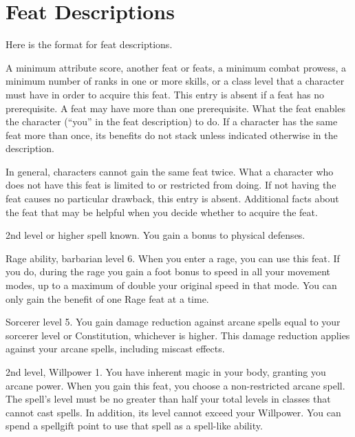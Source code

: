 \twocolumn

\section{Feat Descriptions}
Here is the format for feat descriptions.

\featpre A minimum attribute score, another feat or feats, a minimum combat prowess, a minimum number of ranks in one or more skills, or a class level that a character must have in order to acquire this feat.
This entry is absent if a feat has no prerequisite.
A feat may have more than one prerequisite.
\featben What the feat enables the character (``you'' in the feat description) to do.
If a character has the same feat more than once, its benefits do not stack unless indicated otherwise in the description.
\par In general, characters cannot gain the same feat twice.
What a character who does not have this feat is limited to or restricted from doing.
If not having the feat causes no particular drawback, this entry is absent.
Additional facts about the feat that may be helpful when you decide whether to acquire the feat.

\featpre 2nd level or higher  spell known.
\featben You gain a  bonus to physical defenses.

\featpres Rage ability, barbarian level 6.
\featben When you enter a rage, you can use this feat. If you do, during the rage you gain a  foot bonus to speed in all your movement modes, up to a maximum of double your original speed in that mode.
 You can only gain the benefit of one Rage feat at a time.

\featpre Sorcerer level 5.
\featben You gain damage reduction against arcane spells equal to your sorcerer level or Constitution, whichever is higher.
This damage reduction applies against your arcane spells, including miscast effects.

\featpres 2nd level, Willpower 1.
\featben You have inherent magic in your body, granting you arcane power.
When you gain this feat, you choose a non-restricted arcane spell.
The spell's level must be no greater than half your total levels in classes that cannot cast spells.
In addition, its level cannot exceed your Willpower.
You can spend a spellgift point to use that spell as a spell-like ability.

